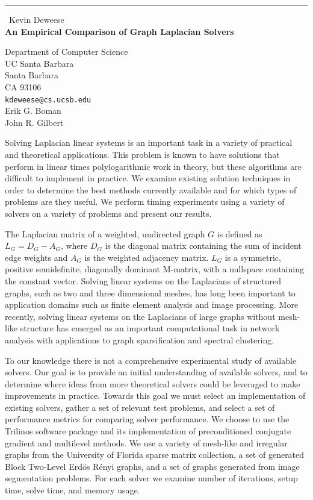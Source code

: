 \documentclass{report}
\begin{document}
\begin{center}
\rule{6in}{1pt} \
{\large Kevin Deweese \\
{\bf An Empirical Comparison of Graph Laplacian Solvers}}

Department of Computer Science \\ UC Santa Barbara \\ Santa Barbara \\ CA 93106
\\
{\tt kdeweese@cs.ucsb.edu}\\
Erik G. Boman\\
John R. Gilbert\end{center}

Solving Laplacian linear systems is an important task in a variety of
practical and theoretical applications. This problem is known to have
solutions that perform in linear times polylogarithmic work in theory,
but these algorithms are difficult to implement in practice. We examine
existing solution techniques in order to determine the best methods
currently available and for which types of problems are they useful. We
perform timing experiments using a variety of solvers on a variety of
problems and present our results.

The Laplacian matrix of a weighted, undirected graph $G$ is defined as
$L_G=D_G-A_G$, where $D_G$ is the diagonal matrix containing the sum of
incident edge weights and $A_G$ is the weighted adjacency matrix. $L_G$
is a symmetric, positive semidefinite, diagonally dominant M-matrix, with
a nullspace
containing the constant vector. Solving linear systems on the Laplacians
of structured graphs, such as two and three dimensional meshes, has long
been important to application domains such as finite element analysis and
image processing. More recently, solving linear systems on the Laplacians
of large graphs without mesh-like structure has emerged as an important
computational task in network analysis with applications to graph
sparsification and spectral clustering.

To our knowledge there is not a comprehensive experimental study of
available solvers. Our goal is to provide an initial understanding of
available solvers, and to determine where ideas from more theoretical
solvers could be leveraged to make improvements in practice. Towards this
goal we must select an implementation of existing solvers, gather a set
of relevant test problems, and select a set of performance metrics for
comparing solver performance. We choose to use the Trilinos software
package and its implementation of preconditioned conjugate gradient and
multilevel methods. We use a variety of mesh-like and irregular graphs
from the University of Florida sparse matrix collection, a set of
generated Block Two-Level Erd\"{o}s R\'{e}nyi graphs, and a set of graphs
generated from image segmentation problems. For each solver we examine
number of iterations, setup time, solve time, and memory usage.
\end{document}
